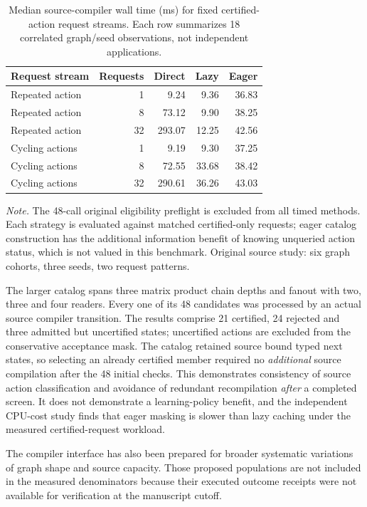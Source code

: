 \documentclass{article}
\newcommand{\tablenote}[1]{\par\vspace{3pt}\begin{minipage}{\linewidth}\footnotesize\emph{Note.} #1\end{minipage}}
\begin{document}
\begin{table}[t]
\centering
\caption{Median source-compiler wall time (ms) for fixed certified-action request streams. Each row summarizes 18 correlated graph/seed observations, not independent applications.}
\label{tab:c2-screening-cost}
\small
\setlength{\tabcolsep}{5pt}
\begin{tabularx}{\linewidth}{@{}Xrrrr@{}}
\toprule
Request stream & Requests & Direct & Lazy & Eager \\
\midrule
Repeated action & 1 & 9.24 & 9.36 & 36.83 \\
Repeated action & 8 & 73.12 & 9.90 & 38.25 \\
Repeated action & 32 & 293.07 & 12.25 & 42.56 \\
Cycling actions & 1 & 9.19 & 9.30 & 37.25 \\
Cycling actions & 8 & 72.55 & 33.68 & 38.42 \\
Cycling actions & 32 & 290.61 & 36.26 & 43.03 \\
\bottomrule
\end{tabularx}
\tablenote{The 48-call original eligibility preflight is excluded from all timed methods. Each strategy is evaluated against matched certified-only requests; eager catalog construction has the additional information benefit of knowing unqueried action status, which is not valued in this benchmark. Original source study: six graph cohorts, three seeds, two request patterns.}
\end{table}

The larger catalog spans three matrix product chain depths and fanout with two, three and four readers. Every one of its 48 candidates was processed by an actual source compiler transition. The results comprise 21 certified, 24 rejected and three admitted but uncertified states; uncertified actions are excluded from the conservative acceptance mask. The catalog retained source bound typed next states, so selecting an already certified member required no \emph{additional} source compilation after the 48 initial checks. This demonstrates consistency of source action classification and avoidance of redundant recompilation \emph{after} a completed screen. It does not demonstrate a learning-policy benefit, and the independent CPU-cost study finds that eager masking is slower than lazy caching under the measured certified-request workload.

The compiler interface has also been prepared for broader systematic variations of graph shape and source capacity. Those proposed populations are not included in the measured denominators because their executed outcome receipts were not available for verification at the manuscript cutoff.
\end{document}

